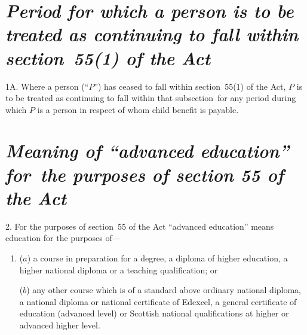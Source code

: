\documentclass[a4paper,12pt]{article}
\begin{document}

\section*{\itshape Period for which a person is to be treated as continuing to fall within section~55(1) of the Act}

1A.  Where a person (“$P$”) has ceased to fall within section~55(1) of the Act, $P$ is to be treated as continuing to fall within that subsection~for any period during which $P$ is a person in respect of whom child benefit is payable.

\section*{\itshape Meaning of “advanced education” for~the purposes of section 55 of the Act}

%
%

2.  For the purposes of section~55 of the Act “advanced education” means education for the purposes of—
\begin{enumerate}\item[]
($a$) a course in preparation for a degree, a diploma of higher education, a higher national diploma or a teaching qualification; or

($b$) any other course which is of a standard above ordinary national diploma, a national diploma or national certificate of Edexcel, a general certificate of education (advanced level) or Scottish national qualifications at higher or advanced higher level.
\end{enumerate}
\end{document}
